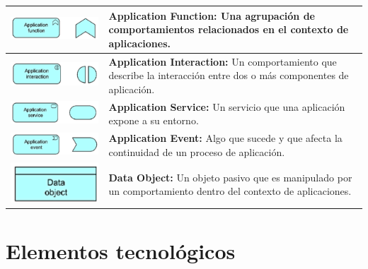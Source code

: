 \begin{longtable}{|c|p{8cm}|}
\hline
\includegraphics{anexos/ARCHI/application/function.png} & 
\textbf{Application Function:} Una agrupación de comportamientos relacionados en el contexto de aplicaciones. \\
\hline
\includegraphics{anexos/ARCHI/application/interaction.png} & 
\textbf{Application Interaction:} Un comportamiento que describe la interacción entre dos o más componentes de aplicación. \\
\hline
\includegraphics{anexos/ARCHI/application/service.png} & 
\textbf{Application Service:} Un servicio que una aplicación expone a su entorno. \\
\hline
\includegraphics{anexos/ARCHI/application/event.png} & 
\textbf{Application Event:} Algo que sucede y que afecta la continuidad de un proceso de aplicación. \\
\hline
\includegraphics{anexos/ARCHI/application/object.png} & 
\textbf{Data Object:} Un objeto pasivo que es manipulado por un comportamiento dentro del contexto de aplicaciones. \\
\hline
\end{longtable}

\section{Elementos tecnológicos}

